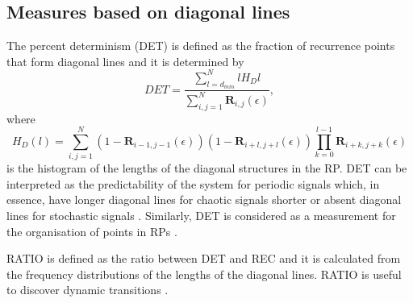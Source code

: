\subsection{Measures based on diagonal lines}
The percent determinism (DET) is defined as the fraction of recurrence points
that form diagonal lines and it is determined by
\begin{equation}
DET=\frac{\sum^{N}_{l=d_{min}} l H_D{l} }{\sum^{N}_{i,j=1} \mathbf{R}_{i,j}(\epsilon) },
\end{equation}
where 
\begin{equation}
H_D(l) = \sum^{N}_{i,j=1} (1- \mathbf{R}_{i-1,j-1}(\epsilon) ) (1- \mathbf{R}_{i+l,j+l}(\epsilon) ) \prod^{l-1}_{k=0}  \mathbf{R}_{i+k,j+k}(\epsilon)
\end{equation}
is the histogram of the lengths of the diagonal structures in the RP.
DET can be interpreted as the predictability of the system for periodic signals 
which, in essence, have longer diagonal lines for chaotic signals shorter or 
absent diagonal lines for stochastic signals \cite{marwan2007, marwan2015}.
Similarly, DET is considered as a measurement for 
the organisation of points in RPs  \cite{iwanski1998}. 


RATIO is defined as the ratio between DET and REC and it is calculated from 
the frequency distributions of the lengths of the diagonal lines.
RATIO is useful to discover dynamic transitions \cite{marwan2015}.
% 
%
%

